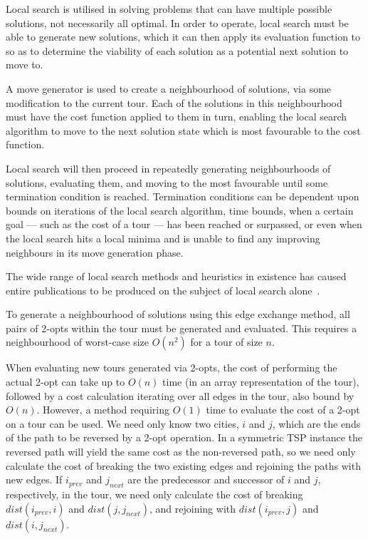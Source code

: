 \documentclass{l4proj}
\begin{document}
Local search is utilised in solving problems that can have multiple possible solutions, not necessarily all optimal. In order to operate, local search must be able to generate new solutions, which it can then apply its evaluation function to so as to determine the viability of each solution as a potential next solution to move to.

A move generator is used to create a neighbourhood of solutions, via some modification to the current tour. Each of the solutions in this neighbourhood must have the cost function applied to them in turn, enabling the local search algorithm to move to the next solution state which is most favourable to the cost function.

Local search will then proceed in repeatedly generating neighbourhoods of solutions, evaluating them, and moving to the most favourable until some termination condition is reached. Termination conditions can be dependent upon bounds on iterations of the local search algorithm, time bounds, when a certain goal --- such as the cost of a tour --- has been reached or surpassed, or even when the local search hits a local minima and is unable to find any improving neighbours in its move generation phase.

The wide range of local search methods and heuristics in existence has caused entire publications to be produced on the subject of local search alone~\cite{stochastic}.

To generate a neighbourhood of solutions using this edge exchange method, all pairs of 2-opts within the tour must be generated and evaluated. This requires a neighbourhood of worst-case size $O(n^2)$ for a tour of size $n$.

When evaluating new tours generated via 2-opts, the cost of performing the actual 2-opt can take up to $O(n)$ time (in an array representation of the tour), followed by a cost calculation iterating over all edges in the tour, also bound by $O(n)$. However, a method requiring $O(1)$ time to evaluate the cost of a 2-opt on a tour can be used. We need only know two cities, $i$ and $j$, which are the ends of the path to be reversed by a 2-opt operation. In a symmetric TSP instance the reversed path will yield the same cost as the non-reversed path, so we need only calculate the cost of breaking the two existing edges and rejoining the paths with new edges. If $i_{prev}$ and $j_{next}$ are the predecessor and successor of $i$ and $j$, respectively, in the tour, we need only calculate the cost of breaking $dist(i_{prev},i)$ and $dist(j,j_{next})$, and rejoining with $dist(i_{prev},j)$ and $dist(i,j_{next})$. 
\end{document}
